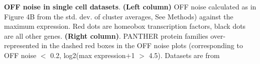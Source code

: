 \textbf{OFF noise in single cell datasets}. \textbf{(Left column)} OFF noise calculated as in Figure 4B from the std. dev. of cluster averages, See Methods) against the maximum expression. Red dots are homeobox transcription factors, black dots are all other genes. \textbf{(Right column)}. PANTHER protein families over-represented in the dashed red boxes in the OFF noise plots (corresponding to OFF noise $<$ 0.2, log2(max expression$+$1 $>$ 4.5). Datasets are from \citep{Zeisel_2015,Tasic_2016,Zeisel_2018,Saunders_2018}